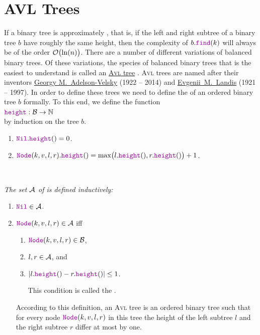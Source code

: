\section{AVL Trees}
If a binary tree is approximately , that is, if the left and right subtree of a binary tree $b$  have
roughly the same height, then the complexity of $b.\mytt{find}(k)$ will always be of the order
$\mathcal{O}\bigl(\ln(n)\bigr)$.  There are a number of different variations of
balanced binary trees.  Of these variations, the species of balanced binary trees that is the easiest to understand is
called an \href{https://en.wikipedia.org/wiki/Avl_tree}{\textsc{Avl} tree} \cite{adelson:62}.  \textsc{Avl} trees are 
named after their inventors \href{https://en.wikipedia.org/wiki/Georgy_Adelson-Velsky}{Georgy M.~Adelson-Velsky}
(1922 -- 2014) and \href{https://en.wikipedia.org/wiki/Evgenii_Landis}{Evgenii~M.~Landis} (1921 -- 1997).
In order to define these trees we need to define the  of an ordered binary tree $b$ formally.  To this
end, we define the function
\\[0.2cm]
\hspace*{1.3cm}
$\mytt{height}: \mathcal{B} \rightarrow \mathbb{N}$
\\[0.2cm]
by induction on the tree $b$.
\begin{enumerate}
\item $\mytt{Nil}.\mytt{height}() = 0$.
\item $\mytt{Node}(k,v,l,r).\mytt{height}() = 
       \max\bigl( l.\mytt{height}(), r.\mytt{height}() \bigr) + 1$. 
\end{enumerate}

\begin{Definition} \hspace*{\fill} \\
{\em 
  The set $\mathcal{A}$ of   is defined inductively:
  \begin{enumerate}
  \item $\mytt{Nil} \in \AVL$.
  \item $\mytt{Node}(k,v,l,r) \in \AVL$ \quad iff 
        \begin{enumerate}
        \item $\mytt{Node}(k,v,l,r) \in \Bin$,
        \item $l, r \in \mathcal{A}$, \quad and
        \item $|l.\mytt{height}() - r.\mytt{height}()| \leq 1$.

              This condition is called the . 
        \end{enumerate}
        According to this definition, an \textsc{Avl} tree is an ordered binary tree such that for every node
        $\mytt{Node}(k,v,l,r)$ in this tree the height of the left subtree $l$ and the right
        subtree  $r$ differ at most by one.  \eox
  \end{enumerate}
}  
\end{Definition}


